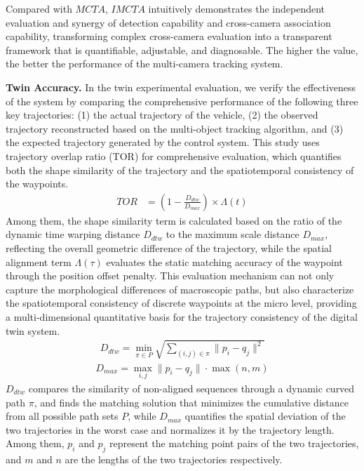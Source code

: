 \documentclass[lettersize,journal]{IEEEtran}
\begin{document}
Compared with \(MCTA\), \(IMCTA\) intuitively demonstrates the independent evaluation and synergy of detection capability and cross-camera association capability, transforming complex cross-camera evaluation into a transparent framework that is quantifiable, adjustable, and diagnosable. 
The higher the value, the better the performance of the multi-camera tracking system.

\textbf{Twin Accuracy.}
In the twin experimental evaluation, we verify the effectiveness of the system by comparing the comprehensive performance of the following three key trajectories: (1) the actual trajectory of the vehicle, (2) the observed trajectory reconstructed based on the multi-object tracking algorithm, and (3) the expected trajectory generated by the control system.
This study uses trajectory overlap ratio (TOR) for comprehensive evaluation, which quantifies both the shape similarity of the trajectory and the spatiotemporal consistency of the waypoints.
\begin{align}
	TOR & = \left(1 - \frac{D_{dtw}}{D_{max}}\right) \times \Lambda(t)
\end{align}
Among them, the shape similarity term is calculated based on the ratio of the dynamic time warping distance \(D_{dtw}\) to the maximum scale distance \(D_{max}\), reflecting the overall geometric difference of the trajectory, while the spatial alignment term \(\Lambda(\tau)\) evaluates the static matching accuracy of the waypoint through the position offset penalty.
This evaluation mechanism can not only capture the morphological differences of macroscopic paths, but also characterize the spatiotemporal consistency of discrete waypoints at the micro level, providing a multi-dimensional quantitative basis for the trajectory consistency of the digital twin system.
\begin{align}
	D_{dtw} = \min_{\pi \in P} \sqrt{\sum_{(i,j)\in\pi} \|p_i - q_j\|^2}
\end{align}
\begin{align}
	D_{max} = \max_{i,j} \|p_i - q_j\| \cdot \max(n,m)
\end{align}
\(D_{dtw}\) compares the similarity of non-aligned sequences through a dynamic curved path \(\pi\), and finds the matching solution that minimizes the cumulative distance from all possible path sets \(P\), while \(D_{max}\) quantifies the spatial deviation of the two trajectories in the worst case and normalizes it by the trajectory length. Among them, \(p_{i}\) and \(p_{j}\) represent the matching point pairs of the two trajectories, and \(m\) and \(n\) are the lengths of the two trajectories respectively.
\end{document}
